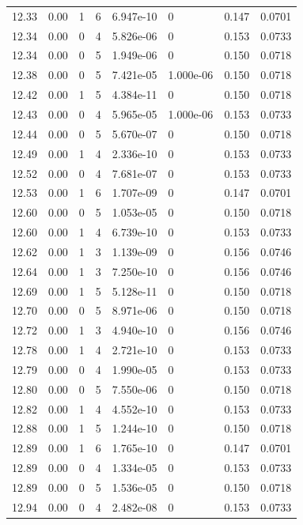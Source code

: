 \documentclass[preview]{standalone}
\begin{document}
{{{{{{{{{{{{\begin{tabular}{L{1.2cm}C{1.2cm} C{0.3cm}C{0.5cm} C{1.4cm}C{1.4cm} C{1.4cm}C{1.4cm}}
  12.33  &  0.00  & 1     &  6 &  6.947e-10  & 0  & 0.147 &  0.0701   \\ 
  12.34  &  0.00  & 0     &  4 &  5.826e-06  & 0  & 0.153 &  0.0733   \\ 
  12.34  &  0.00  & 0     &  5 &  1.949e-06  & 0  & 0.150 &  0.0718   \\ 
  12.38  &  0.00  & 0     &  5 &  7.421e-05  & 1.000e-06  & 0.150 &  0.0718   \\ 
  12.42  &  0.00  & 1     &  5 &  4.384e-11  & 0  & 0.150 &  0.0718   \\ 
  12.43  &  0.00  & 0     &  4 &  5.965e-05  & 1.000e-06  & 0.153 &  0.0733   \\ 
  12.44  &  0.00  & 0     &  5 &  5.670e-07  & 0  & 0.150 &  0.0718   \\ 
  12.49  &  0.00  & 1     &  4 &  2.336e-10  & 0  & 0.153 &  0.0733   \\ 
  12.52  &  0.00  & 0     &  4 &  7.681e-07  & 0  & 0.153 &  0.0733   \\ 
  12.53  &  0.00  & 1     &  6 &  1.707e-09  & 0  & 0.147 &  0.0701   \\ 
  12.60  &  0.00  & 0     &  5 &  1.053e-05  & 0  & 0.150 &  0.0718   \\ 
  12.60  &  0.00  & 1     &  4 &  6.739e-10  & 0  & 0.153 &  0.0733   \\ 
  12.62  &  0.00  & 1     &  3 &  1.139e-09  & 0  & 0.156 &  0.0746   \\ 
  12.64  &  0.00  & 1     &  3 &  7.250e-10  & 0  & 0.156 &  0.0746   \\ 
  12.69  &  0.00  & 1     &  5 &  5.128e-11  & 0  & 0.150 &  0.0718   \\ 
  12.70  &  0.00  & 0     &  5 &  8.971e-06  & 0  & 0.150 &  0.0718   \\ 
  12.72  &  0.00  & 1     &  3 &  4.940e-10  & 0  & 0.156 &  0.0746   \\ 
  12.78  &  0.00  & 1     &  4 &  2.721e-10  & 0  & 0.153 &  0.0733   \\ 
  12.79  &  0.00  & 0     &  4 &  1.990e-05  & 0  & 0.153 &  0.0733   \\ 
  12.80  &  0.00  & 0     &  5 &  7.550e-06  & 0  & 0.150 &  0.0718   \\ 
  12.82  &  0.00  & 1     &  4 &  4.552e-10  & 0  & 0.153 &  0.0733   \\ 
  12.88  &  0.00  & 1     &  5 &  1.244e-10  & 0  & 0.150 &  0.0718   \\ 
  12.89  &  0.00  & 1     &  6 &  1.765e-10  & 0  & 0.147 &  0.0701   \\ 
  12.89  &  0.00  & 0     &  4 &  1.334e-05  & 0  & 0.153 &  0.0733   \\ 
  12.89  &  0.00  & 0     &  5 &  1.536e-05  & 0  & 0.150 &  0.0718   \\ 
  12.94  &  0.00  & 0     &  4 &  2.482e-08  & 0  & 0.153 &  0.0733   \\ 
\hline 
\end{tabular} 

}}}}}}}}}}}}
\end{document}

